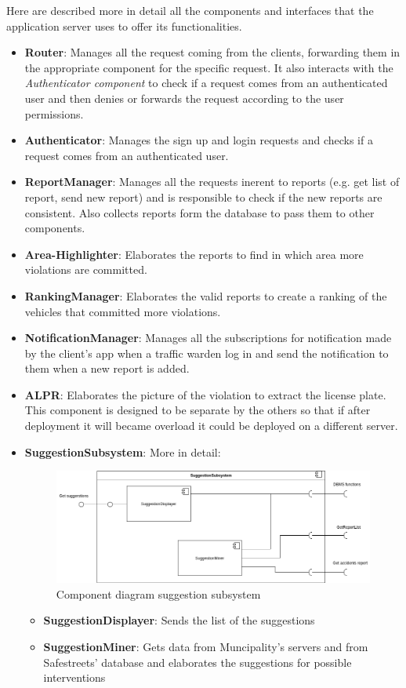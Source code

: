 \documentclass{article}
\begin{document}
Here are described more in detail all the components and interfaces that
the application server uses to offer its functionalities.
\begin{itemize}
	\item \textbf{Router}: Manages all the request coming from the clients, forwarding them in the appropriate component for the specific request. 
	It also interacts with the \textit{Authenticator component} to check if a request comes from an authenticated user and then denies or forwards the request according to the user permissions.
	\item \textbf{Authenticator}: Manages the sign up and login requests and checks if a request comes from an authenticated user.
	\item \textbf{ReportManager}: Manages all the requests inerent to reports (e.g. get list of report, send new report) and is responsible to check if the new reports are consistent. Also collects reports form the database to pass them to other components.
	\item \textbf{Area-Highlighter}: Elaborates the reports to find in which area more violations are committed.
	\item \textbf{RankingManager}: Elaborates the valid reports to create a ranking of the vehicles that committed more violations.
	\item \textbf{NotificationManager}: Manages all the subscriptions for notification made by the client's app when a traffic warden log in and send the notification to them when a new report is added.
	\item \textbf{ALPR}: Elaborates the picture of the violation to extract the license plate. This component is designed to be separate by the others so that if after deployment it will became overload it could be deployed on a different server.
	\item \textbf{SuggestionSubsystem}: More in detail:
		\\
\begin{figure}[!htb]
\centering
	\includegraphics[width=1.0\textwidth]{images/SuggestionSubsystem-components-diagram.png}
	\caption{Component diagram suggestion subsystem}
	\label{fig:component-suggestion-subsystem}
\end{figure}
\begin{itemize}
	\item \textbf{SuggestionDisplayer}: Sends the list of the suggestions
	\item \textbf{SuggestionMiner}: Gets data from Muncipality's servers and from Safestreets' database and elaborates the suggestions for possible interventions
\end{itemize}
\end{itemize}
\end{document}
